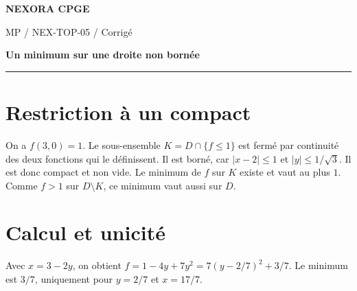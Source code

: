 \documentclass[11pt,a4paper]{article}
\begin{document}
{\small\bfseries\color{nexorablue} NEXORA CPGE}\par
{\small MP / NEX-TOP-05 / Corrigé}\par
{\LARGE\bfseries Un minimum sur une droite non bornée}\par
\vspace{0.25em}\hrule\vspace{0.6em}

\section*{Restriction à un compact}
On a $f(3,0)=1$. Le sous-ensemble $K=D\cap\{f\le1\}$ est fermé par continuité des deux fonctions qui le définissent. Il est borné, car $|x-2|\le1$ et $|y|\le1/\sqrt3$. Il est donc compact et non vide. Le minimum de $f$ sur $K$ existe et vaut au plus $1$. Comme $f>1$ sur $D\setminus K$, ce minimum vaut aussi sur $D$.

\section*{Calcul et unicité}
Avec $x=3-2y$, on obtient $f=1-4y+7y^2=7(y-2/7)^2+3/7$. Le minimum est $3/7$, uniquement pour $y=2/7$ et $x=17/7$.
\end{document}
